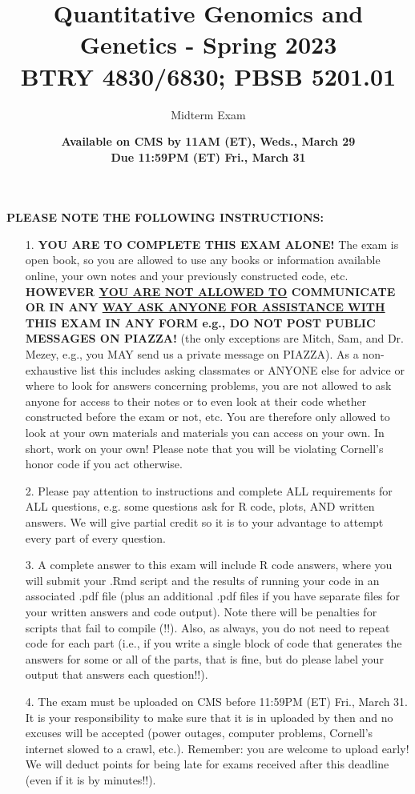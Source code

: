 \documentclass[letterpaper, 11pt]{article}
\title{Quantitative Genomics and Genetics - Spring 2023 \\
BTRY 4830/6830; PBSB 5201.01}
\author{Midterm Exam}
\date{{\bf Available on CMS by 11AM (ET), Weds., March 29 \\ Due 11:59PM (ET) Fri., March 31}}
\begin{document}
\vspace{-20in}

\maketitle

{\bf PLEASE NOTE THE FOLLOWING INSTRUCTIONS:}

\begin{itemize}
\item[1.] \textbf{YOU ARE TO COMPLETE THIS EXAM ALONE!} The exam is open book, so you are allowed to use any books or information available online, your own notes and your previously constructed code, etc.  \textbf{HOWEVER \underline{YOU ARE NOT ALLOWED TO} \textbf{COMMUNICATE OR IN ANY} \underline{WAY ASK ANYONE FOR ASSISTANCE WITH} \textbf{THIS EXAM IN ANY FORM} e.g., DO NOT POST PUBLIC MESSAGES ON PIAZZA!} (the only exceptions are Mitch, Sam, and Dr. Mezey, e.g., you MAY send us a private message on PIAZZA).  As a non-exhaustive list this includes asking classmates or ANYONE else for advice or where to look for answers concerning problems, you are not allowed to ask anyone for access to their notes or to even look at their code whether constructed before the exam or not, etc. You are therefore only allowed to look at your own materials and materials you can access on your own.  In short, work on your own!  Please note that you will be violating Cornell's honor code if you act otherwise.

\item[2.] Please pay attention to instructions and complete ALL requirements for ALL questions, e.g. some questions ask for R code, plots, AND written answers.  We will give partial credit so it is to your advantage to attempt every part of every question.  

\item[3.] A complete answer to this exam will include R code answers, where you will submit your .Rmd script and the results of running your code in an associated .pdf file (plus an additional .pdf files if you have separate files for your written answers and code output).  Note there will be penalties for scripts that fail to compile (!!).  Also, as always, you do not need to repeat code for each part (i.e., if you write a single block of code that generates the answers for some or all of the parts, that is fine, but do please label your output that answers each question!!). 

\item[4.] The exam must be uploaded on CMS before 11:59PM (ET) Fri., March 31.  It is your responsibility to make sure that it is in uploaded by then and no excuses will be accepted (power outages, computer problems, Cornell's internet slowed to a crawl, etc.).  Remember: you are welcome to upload early!  We will deduct points for being late for exams received after this deadline (even if it is by minutes!!).
\end{itemize}
\end{document}
